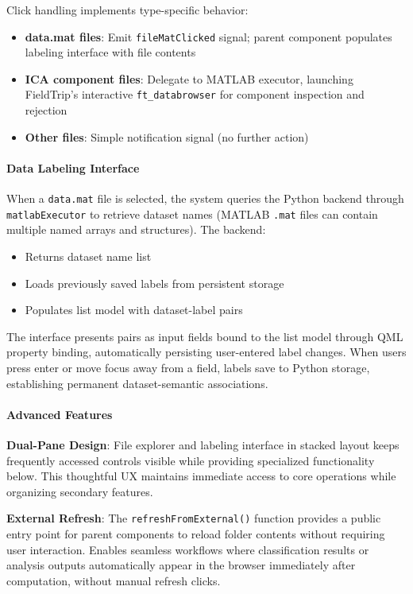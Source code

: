 \documentclass[12pt]{report}
\begin{document}
Click handling implements type-specific behavior:

\begin{itemize}
\item \textbf{data.mat files}: Emit \verb|fileMatClicked| signal; parent component populates labeling interface with file contents
\item \textbf{ICA component files}: Delegate to MATLAB executor, launching FieldTrip's interactive \verb|ft_databrowser| for component inspection and rejection
\item \textbf{Other files}: Simple notification signal (no further action)
\end{itemize}

\paragraph{Data Labeling Interface}\mbox{}

When a \verb|data.mat| file is selected, the system queries the Python backend through \verb|matlabExecutor| to retrieve dataset names (MATLAB \verb|.mat| files can contain multiple named arrays and structures). The backend:

\begin{itemize}
\item Returns dataset name list
\item Loads previously saved labels from persistent storage
\item Populates list model with dataset-label pairs
\end{itemize}

The interface presents pairs as input fields bound to the list model through QML property binding, automatically persisting user-entered label changes. When users press enter or move focus away from a field, labels save to Python storage, establishing permanent dataset-semantic associations.

\paragraph{Advanced Features}\mbox{}

\textbf{Dual-Pane Design}: File explorer and labeling interface in stacked layout keeps frequently accessed controls visible while providing specialized functionality below. This thoughtful UX maintains immediate access to core operations while organizing secondary features.

\textbf{External Refresh}: The \verb|refreshFromExternal()| function provides a public entry point for parent components to reload folder contents without requiring user interaction. Enables seamless workflows where classification results or analysis outputs automatically appear in the browser immediately after computation, without manual refresh clicks.
\end{document}
